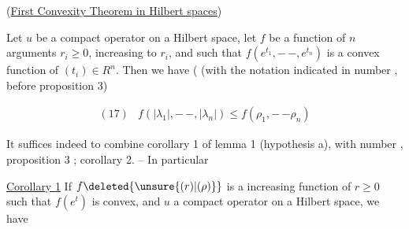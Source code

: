 
\reversemarginpar{}\normalmarginpar
(\uline{First Convexity Theorem in Hilbert spaces})

\reversemarginpar
{}
\normalmarginpar
{} Let $u$ be a compact operator on a Hilbert space, let  $f$ be a  function of $n$ arguments $r_i\geq0$, increasing  to  $r_i$, and such that $f(e^{t_1},\mathord{-}\,\mathord{-},e^{t_n})$ is a convex function of $(t_i)\in R^n$. Then we have ( (with the notation indicated in number , before proposition 3)

\[
\begin{array}{ll}
(17) & \displaystyle f(|\lambda_1|,\mathord{-}\,\mathord{-},|\lambda_n|)\leq f(\rho_1,\mathord{-}\,\mathord{-}\rho_n)
\end{array}
\]

It suffices indeed to combine corollary 1 of lemma 1  (hypothesis a), with number , proposition 3 ; corollary 2. -- In particular

\uline{Corollary 1} If $f\deleted{\unsure{(r)|(\rho)}}$ is a  increasing function of $r\geq0$ such that $f(e^t)$ is convex, and $u$ a compact operator on a Hilbert space, we have

\reversemarginpar{}\normalmarginpar
